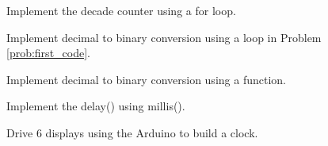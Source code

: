 %
%
\begin{problem}
Implement the decade counter using a for loop.
\end{problem}
%
%
%
\begin{problem}
Implement decimal to binary conversion using a loop in Problem \ref{prob:first_code}.
\end{problem}
%
\begin{problem}
Implement decimal to binary conversion using a function.
\end{problem}
%
\begin{problem}
Implement the delay() using millis().
\end{problem}
%
\begin{problem}
Drive 6 displays using the Arduino to build a clock.
\end{problem}
%





